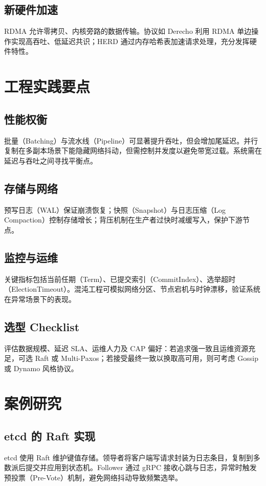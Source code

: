 \section{新硬件加速}
RDMA 允许零拷贝、内核旁路的数据传输。协议如 Derecho 利用 RDMA 单边操作实现高吞吐、低延迟共识；HERD 通过内存哈希表加速请求处理，充分发挥硬件特性。\par
\chapter{工程实践要点}
\section{性能权衡}
批量（Batching）与流水线（Pipeline）可显著提升吞吐，但会增加尾延迟。并行复制在多副本场景下能隐藏网络抖动，但需控制并发度以避免带宽过载。系统需在延迟与吞吐之间寻找平衡点。\par
\section{存储与网络}
预写日志（WAL）保证崩溃恢复；快照（Snapshot）与日志压缩（Log Compaction）控制存储增长；背压机制在生产者过快时减缓写入，保护下游节点。\par
\section{监控与运维}
关键指标包括当前任期（Term）、已提交索引（CommitIndex）、选举超时（ElectionTimeout）。混沌工程可模拟网络分区、节点宕机与时钟漂移，验证系统在异常场景下的表现。\par
\section{选型 Checklist}
评估数据规模、延迟 SLA、运维人力及 CAP 偏好：若追求强一致且运维资源充足，可选 Raft 或 Multi-Paxos；若接受最终一致以换取高可用，则可考虑 Gossip 或 Dynamo 风格协议。\par
\chapter{案例研究}
\section{etcd 的 Raft 实现}
etcd 使用 Raft 维护键值存储。领导者将客户端写请求封装为日志条目，复制到多数派后提交并应用到状态机。Follower 通过 gRPC 接收心跳与日志，异常时触发预投票（Pre-Vote）机制，避免网络抖动导致频繁选举。\par
